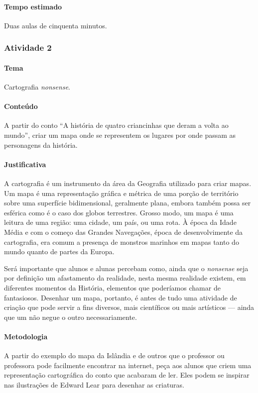 \documentclass[11pt]{extarticle}
\begin{document}
\paragraph{Tempo estimado} Duas aulas de cinquenta minutos.

\subsubsection{Atividade 2}


\paragraph{Tema} Cartografia \emph{nonsense}.

\paragraph{Conteúdo} A partir do conto ``A história de quatro criancinhas que deram a volta ao mundo'',
criar um mapa onde se representem os lugares por onde passam as personagens da história.

\paragraph{Justificativa} A cartografia é um instrumento da área da Geografia utilizado para 
criar mapas. Um mapa é uma representação gráfica e métrica de uma porção de território sobre 
uma superfície bidimensional, geralmente plana, embora também possa ser esférica como é o caso 
dos globos terrestres. Grosso modo, um mapa é uma leitura de uma região: uma cidade, um país, 
ou uma rota. À época da Idade Média e com o começo das Grandes Navegações, época de desenvolvimente
da cartografia, era comum a presença de monstros marinhos em mapas tanto do mundo quanto de partes da Europa.


Será importante que alunos e alunas percebam como, ainda que o \emph{nonsense} seja
por definição um afastamento da realidade, nesta mesma realidade existem, em diferentes momentos
da História, elementos que poderíamos chamar de fantasiosos. Desenhar um mapa, portanto, 
é antes de tudo uma atividade de criação que pode servir a fins diversos, mais
científicos ou mais artísticos --- ainda que um não negue o outro necessariamente.

\paragraph{Metodologia} A partir do exemplo do mapa da Islândia e de outros que o professor
ou professora pode facilmente encontrar na internet, peça aos alunos que criem
uma representação cartográfica do conto que acabaram de ler. 
Eles podem se inspirar nas ilustrações de Edward Lear para desenhar as criaturas. 
\end{document}
